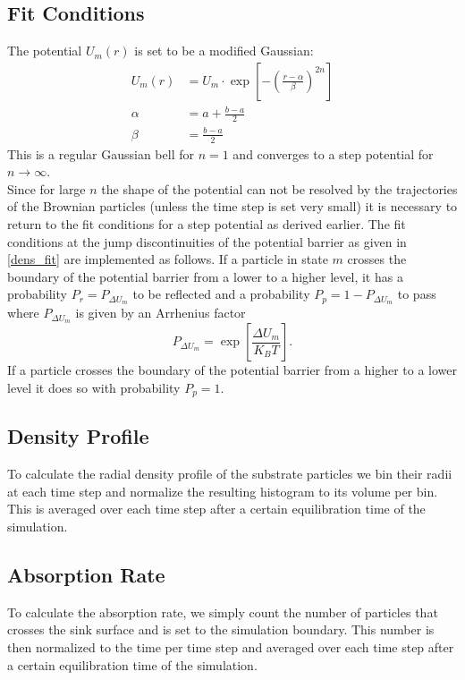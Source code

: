 \subsection{Fit Conditions}
The potential $U_m(r)$ is set to be a modified Gaussian:
\begin{align}
    U_m(r) &= U_m \cdot \exp \left[-\left( \frac{r-\alpha}{\beta} \right)^{2n}\right] \nonumber \\
    \alpha &= a + \frac{b-a}{2} \nonumber \\
    \beta  &= \frac{b-a}{2}
    \label{mod_gauss}
\end{align}
This is a regular Gaussian bell for $n=1$ and converges to a step potential for $n\rightarrow \infty$. \\
Since for large $n$ the shape of the potential can not be resolved by the trajectories of the Brownian particles (unless the time step is set very small) it is necessary to return to the fit conditions for a step potential as derived earlier.
The fit conditions at the jump discontinuities of the potential barrier as given in \eqref{dens_fit} are implemented as follows. If a particle in state $m$ crosses the boundary of the potential barrier from a lower to a higher level, it has a probability $P_r = P_{\Delta U_m}$ to be reflected and a probability $P_p = 1 - P_{\Delta U_m}$ to pass where $P_{\Delta U_m}$ is given by an Arrhenius factor
\begin{equation}
    P_{ \Delta U_m} = \exp \left[\frac{\Delta U_m}{K_B T}  \right].
    \label{arrhenius_factor}
\end{equation}
If a particle crosses the boundary of the potential barrier from a higher to a lower level it does so with probability $P_p = 1$.
\subsection{Density Profile}
To calculate the radial density profile of the substrate particles we bin their radii at each time step and normalize the resulting histogram to its volume per bin. This is averaged over each time step after a certain equilibration time of the simulation.
\subsection{Absorption Rate}
To calculate the absorption rate, we simply count the number of particles that crosses the sink surface and is set to the simulation boundary. This number is then normalized to the time per time step and averaged over each time step after a certain equilibration time of the simulation.
